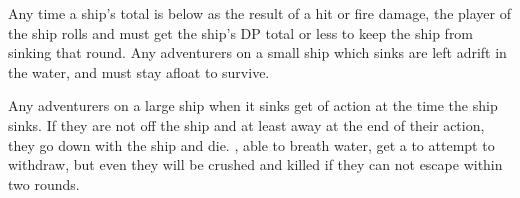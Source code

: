 \begin{multicols*}{2}
Any time a ship's total is below \tcdefine{20 \DP} as the result of a hit or fire damage, the player of the ship rolls  and must get the ship's DP total or less to keep the ship from sinking that round. Any adventurers on a small ship which sinks are left adrift in the water, and must stay afloat to survive.

Any adventurers on a large ship when it sinks get  of action at the time the ship sinks. If they are not off the ship and at least  away at the end of their action, they go down with the ship and die. , able to breath water, get a  to attempt to withdraw, but even they will be crushed and killed if they can not escape within two rounds.
\end{multicols*}